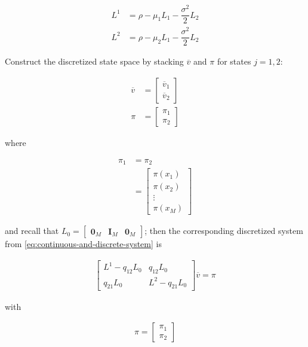 \documentclass[11pt]{article}
\theoremstyle{definition}
\begin{document}
\begin{align}
{L}^1 &= \rho - \mu_1 L_1 - \dfrac{\sigma^2}{2} L_2 \\
{L}^2 &= \rho - \mu_2 L_1 - \dfrac{\sigma^2}{2} L_2
\end{align}


Construct the discretized state space by stacking $\overline{v}$ and ${\pi}$ for states $j= 1, 2$:

\begin{align}
\overline{v} &= \begin{bmatrix}
\overline{v}_1 \\
\overline{v}_2
\end{bmatrix} \\
\pi &= \begin{bmatrix}
\pi_1\\
\pi_2
\end{bmatrix}
\end{align}

where 

\begin{align}
\pi_1 &= \pi_2 \\
&=
\begin{bmatrix}
\pi (x_1) \\
\pi (x_2) \\
\vdots \\
\pi (x_M)  
\end{bmatrix}
\end{align}


and recall that $L_0 = \begin{bmatrix} \mathbf{0}_M &  \mathbf{I}_M & \mathbf{0}_M  \end{bmatrix} $; then the corresponding discretized system from \eqref{eq:continuous-and-discrete-system} is

\begin{align}
\begin{bmatrix}
{L}^1 - q_{12} L_0 & q_{12} L_0 \\ 
q_{21} L_0 & {L}^2 - q_{21} L_0
\end{bmatrix}
\overline{v}
=
\pi
\label{eq:continuous-and-discrete-system-discrete} 
\end{align}

with

\begin{align}
\pi = \begin{bmatrix}
\pi_1 \\ \pi_2
\end{bmatrix}
\end{align}
\end{document}

